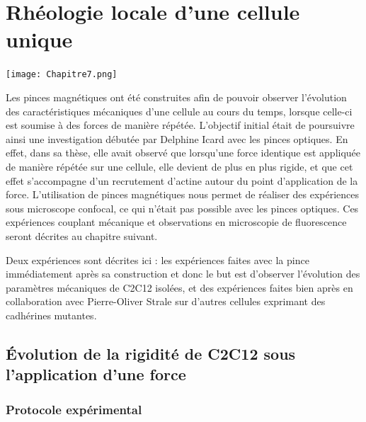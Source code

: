 %
%

\chapter{Rhéologie locale d'une cellule unique}
\begin{center}
\texttt{[image: Chapitre7.png]}

\end{center}
\newpage

Les pinces magnétiques ont été construites afin de pouvoir observer l'évolution des caractéristiques mécaniques d'une cellule au cours du temps, lorsque celle-ci est soumise à des forces de manière répétée. L'objectif initial était de poursuivre ainsi une investigation débutée par Delphine Icard avec les pinces optiques. En effet, dans sa thèse, elle avait observé que lorsqu'une force identique est appliquée de manière répétée sur une cellule, elle devient de plus en plus rigide, et que cet effet s'accompagne d'un recrutement d'actine autour du point d'application de la force. L'utilisation de pinces magnétiques nous permet de réaliser des expériences sous microscope confocal, ce qui n'était pas possible avec les pinces optiques. Ces expériences couplant mécanique et observations en microscopie de fluorescence seront décrites au chapitre suivant. 

Deux expériences sont décrites ici : les expériences faites avec la pince immédiatement après sa construction et donc le but est d'observer l'évolution des paramètres mécaniques de C2C12 isolées, et des expériences faites bien après en collaboration avec Pierre-Oliver Strale sur d'autres cellules exprimant des cadhérines mutantes. 

\section{\'Evolution de la rigidité de C2C12 sous l'application d'une force}

\subsection{Protocole expérimental}

